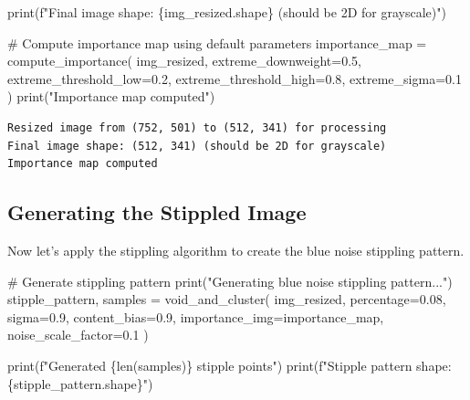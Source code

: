 \documentclass[
  letterpaper,
  DIV=11,
  numbers=noendperiod]{scrartcl}
\newenvironment{Shaded}{\begin{snugshade}}{\end{snugshade}}
\newcommand{\BuiltInTok}[1]{\textcolor[rgb]{0.00,0.23,0.31}{#1}}
\newcommand{\CommentTok}[1]{\textcolor[rgb]{0.37,0.37,0.37}{#1}}
\newcommand{\FloatTok}[1]{\textcolor[rgb]{0.68,0.00,0.00}{#1}}
\newcommand{\NormalTok}[1]{\textcolor[rgb]{0.00,0.23,0.31}{#1}}
\newcommand{\OperatorTok}[1]{\textcolor[rgb]{0.37,0.37,0.37}{#1}}
\newcommand{\SpecialCharTok}[1]{\textcolor[rgb]{0.37,0.37,0.37}{#1}}
\newcommand{\SpecialStringTok}[1]{\textcolor[rgb]{0.13,0.47,0.30}{#1}}
\newcommand{\StringTok}[1]{\textcolor[rgb]{0.13,0.47,0.30}{#1}}
\begin{document}
\begin{Shaded}
\begin{Highlighting}[]
\BuiltInTok{print}\NormalTok{(}\SpecialStringTok{f"Final image shape: }\SpecialCharTok{\{}\NormalTok{img\_resized}\SpecialCharTok{.}\NormalTok{shape}\SpecialCharTok{\}}\SpecialStringTok{ (should be 2D for grayscale)"}\NormalTok{)}

\CommentTok{\# Compute importance map using default parameters}
\NormalTok{importance\_map }\OperatorTok{=}\NormalTok{ compute\_importance(}
\NormalTok{    img\_resized,}
\NormalTok{    extreme\_downweight}\OperatorTok{=}\FloatTok{0.5}\NormalTok{,}
\NormalTok{    extreme\_threshold\_low}\OperatorTok{=}\FloatTok{0.2}\NormalTok{,}
\NormalTok{    extreme\_threshold\_high}\OperatorTok{=}\FloatTok{0.8}\NormalTok{,}
\NormalTok{    extreme\_sigma}\OperatorTok{=}\FloatTok{0.1}
\NormalTok{)}
\BuiltInTok{print}\NormalTok{(}\StringTok{"Importance map computed"}\NormalTok{)}
\end{Highlighting}
\end{Shaded}

\begin{verbatim}
Resized image from (752, 501) to (512, 341) for processing
Final image shape: (512, 341) (should be 2D for grayscale)
Importance map computed
\end{verbatim}

\subsection{Generating the Stippled
Image}\label{generating-the-stippled-image}

Now let's apply the stippling algorithm to create the blue noise
stippling pattern.

\label{generate-stipple}
\begin{Shaded}
\begin{Highlighting}[]
\CommentTok{\# Generate stippling pattern}
\BuiltInTok{print}\NormalTok{(}\StringTok{"Generating blue noise stippling pattern..."}\NormalTok{)}
\NormalTok{stipple\_pattern, samples }\OperatorTok{=}\NormalTok{ void\_and\_cluster(}
\NormalTok{    img\_resized,}
\NormalTok{    percentage}\OperatorTok{=}\FloatTok{0.08}\NormalTok{,}
\NormalTok{    sigma}\OperatorTok{=}\FloatTok{0.9}\NormalTok{,}
\NormalTok{    content\_bias}\OperatorTok{=}\FloatTok{0.9}\NormalTok{,}
\NormalTok{    importance\_img}\OperatorTok{=}\NormalTok{importance\_map,}
\NormalTok{    noise\_scale\_factor}\OperatorTok{=}\FloatTok{0.1}
\NormalTok{)}

\BuiltInTok{print}\NormalTok{(}\SpecialStringTok{f"Generated }\SpecialCharTok{\{}\BuiltInTok{len}\NormalTok{(samples)}\SpecialCharTok{\}}\SpecialStringTok{ stipple points"}\NormalTok{)}
\BuiltInTok{print}\NormalTok{(}\SpecialStringTok{f"Stipple pattern shape: }\SpecialCharTok{\{}\NormalTok{stipple\_pattern}\SpecialCharTok{.}\NormalTok{shape}\SpecialCharTok{\}}\SpecialStringTok{"}\NormalTok{)}
\end{Highlighting}
\end{Shaded}
\end{document}
